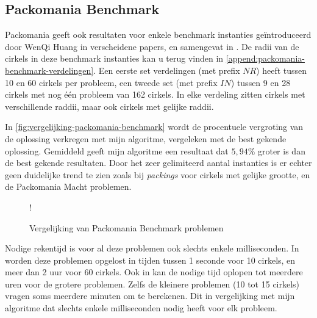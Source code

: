 \documentclass[12pt,a4paper,oneside]{book}
\begin{document}
{\subsection{Packomania Benchmark}

Packomania geeft ook resultaten voor enkele benchmark instanties geïntroduceerd door WenQi Huang in verscheidene papers, en samengevat in \cite{huang2006new}.
De radii van de cirkels in deze benchmark instanties kan u terug vinden in \autoref{append:packomania-benchmark-verdelingen}.
Een eerste set verdelingen (met prefix $NR$) heeft tussen 10 en 60 cirkels per probleem, een tweede set (met prefix $IN$) tussen 9 en 28 cirkels met nog één probleem van 162 cirkels.
In elke verdeling zitten cirkels met verschillende raddii, maar ook cirkels met gelijke raddii.

In \autoref{fig:vergelijking-packomania-benchmark} wordt de procentuele vergroting van de oplossing verkregen met mijn algoritme, vergeleken met de best gekende oplossing.
Gemiddeld geeft mijn algoritme een resultaat dat $5,94\%$ groter is dan de best gekende resultaten.
Door het zeer gelimiteerd aantal instanties is er echter geen duidelijke trend te zien zoals bij \textit{packings} voor cirkels met gelijke grootte, en de Packomania Macht problemen.

\begin {figure}
	\centering
	 {!} {
	}
	\caption{Vergelijking van Packomania Benchmark problemen}
	\label{fig:vergelijking-packomania-benchmark}
\end {figure}

Nodige rekentijd is voor al deze problemen ook slechts enkele milliseconden.
In \cite{ye2013iterated} worden deze problemen opgelost in tijden tussen 1 seconde voor 10 cirkels, en meer dan 2 uur voor 60 cirkels.
Ook in \cite{huang2013tabu} kan de nodige tijd oplopen tot meerdere uren voor de grotere problemen.
Zelfs de kleinere problemen (10 tot 15 cirkels) vragen soms meerdere minuten om te berekenen.
Dit in vergelijking met mijn algoritme dat slechts enkele milliseconden nodig heeft voor elk probleem.

}
\end{document}
